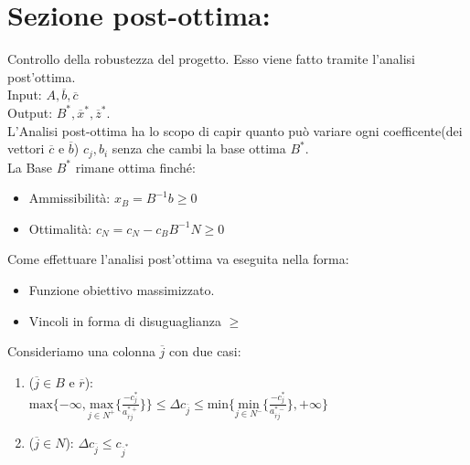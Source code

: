 \documentclass{article}
\begin{document}
\section{\textbf{Sezione post-ottima:}}

Controllo della robustezza del progetto. Esso viene fatto tramite l'analisi post'ottima.\\
Input: $A, \overline{b}, \overline{c}$\\
Output: $B^{\ast}, \overline{x}^{\ast}, \overline{z}^{\ast}$.\\
L'Analisi post-ottima ha lo scopo di capir quanto può variare ogni coefficente(dei vettori $\overline{c}$ e $\overline{b}$) $c_j, b_i$ senza che cambi la base ottima $B^{\ast}$.\\
La Base $B^{\ast}$ rimane ottima finché:
\begin{itemize}
  \item Ammissibilità: $x_B=B^{-1}b \ge 0$
  \item Ottimalità: $c_N=c_N-c_BB^{-1}N \ge 0$
\end{itemize}

Come effettuare l'analisi post'ottima va eseguita nella forma:
\begin{itemize}
  \item Funzione obiettivo massimizzato.
  \item Vincoli in forma di disuguaglianza $\ge$
\end{itemize}
Consideriamo una colonna $\overline{j}$ con due casi:
\begin{enumerate}
  \item ($\overline{j} \in B$ e $\overline{r}$):\\ $\text{max}\{-\infty, \underset{j \in N^+}{\text{max}}\{\frac{-c_j^{\ast}}{a^{\ast+}_{\overline{r}j}}\}\} \le \Delta c_{\overline{j}} \le \text{min}\{\underset{j \in N^-}{\text{min}}\{\frac{-c^{\ast}_j}{a^{\ast -}_{\overline{r}j}}\}, +\infty\}$
  \item ($\overline{j} \in N$): $\Delta c_{\overline{j}} \le c_{\overline{j}^{\ast}}$
\end{enumerate}
\end{document}
